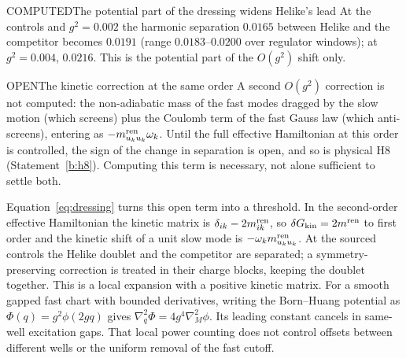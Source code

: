 \begin{claim}{COMPUTED}{The potential part of the dressing widens Helike's lead}\label{b:widen}
At the controls and $g^2=0.002$ the harmonic separation $0.0165$ between Helike and the competitor becomes $0.0191$ (range
$0.0183$--$0.0200$ over regulator windows); at $g^2=0.004$, $0.0216$. This is the potential part of the $O(g^2)$ shift
only.
\end{claim}

\begin{claim}{OPEN}{The kinetic correction at the same order}\label{b:kinetic}
A second $O(g^2)$ correction is not computed: the non-adiabatic mass of the fast modes dragged by the slow motion (which
screens) plus the Coulomb term of the fast Gauss law (which anti-screens), entering as $-m^{\rm ren}_{u_ku_k}\omega_k$.
Until the full effective Hamiltonian at this order is controlled, the sign of the change in separation is open,
and so is physical H8 (Statement~\ref{b:h8}). Computing this term is necessary, not alone sufficient to settle both.
\end{claim}

Equation~\eqref{eq:dressing} turns this open term into a threshold. In the second-order effective Hamiltonian the
kinetic matrix is $\delta_{ik}-2m^{\rm ren}_{ik}$, so $\delta G_{\rm kin}=2m^{\rm ren}$ to first order and the kinetic
shift of a unit slow mode is $-\omega_k m^{\rm ren}_{u_ku_k}$. At the sourced controls the Helike doublet and the
competitor are separated; a symmetry-preserving correction is treated in their charge blocks, keeping the doublet
together. This is a local expansion with a positive kinetic matrix. For a smooth gapped fast chart with bounded
derivatives, writing the Born--Huang potential as $\Phi(q)=g^2\phi(2gq)$ gives
$\nabla_q^2\Phi=4g^4\nabla_M^2\phi$. Its leading constant cancels in same-well excitation gaps. That local power
counting does not control offsets between different wells or the uniform removal of the fast cutoff.

